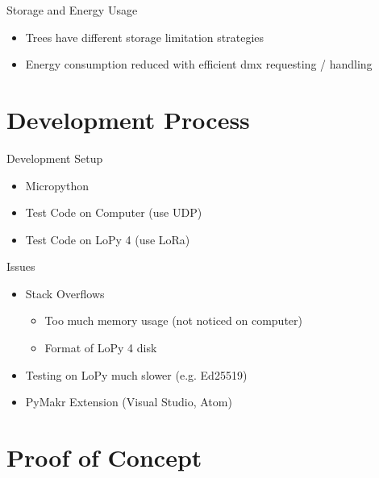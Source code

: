 \documentclass[aspectratio=169]{beamer}
\begin{document}
\begin{frame}[c]{Storage and Energy Usage}
\begin{itemize}
	\item Trees have different storage limitation strategies
	\item Energy consumption reduced with efficient dmx requesting / handling
\end{itemize}
\end{frame}

\section{Development Process}

\begin{frame}[c]{Development Setup}
\begin{itemize}
    \item Micropython
    \item Test Code on Computer (use UDP)
    \item Test Code on LoPy 4 (use LoRa)
\end{itemize}        
\end{frame}

\begin{frame}[c]{Issues}
\begin{itemize}
    \item Stack Overflows
    	\begin{itemize}
	    \item Too much memory usage (not noticed on computer)
	    \item Format of LoPy 4 disk
	\end{itemize}
    \item Testing on LoPy much slower (e.g. Ed25519)
    \item PyMakr Extension (Visual Studio, Atom)
\end{itemize}        
\end{frame}

\section{Proof of Concept}
\end{document}
